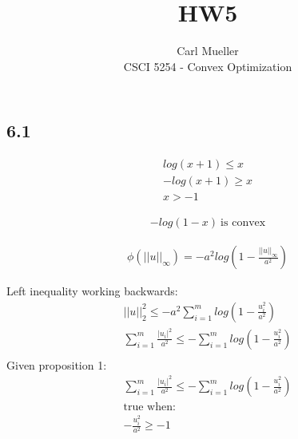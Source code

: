 \documentclass[12pt]{article}
\newenvironment{proposition}[2][Proposition]{\begin{trivlist}
\item[\hskip \labelsep {\bfseries #1}\hskip \labelsep {\bfseries #2.}]}{\end{trivlist}}
\begin{document}
 
 
 
\title{HW5}
\author{Carl Mueller\\ %
CSCI 5254 - Convex Optimization} %
\maketitle

\subsection*{6.1}
\begin{proposition}{1}
\begin{align}
log(x+1) \le x\\ -log(x+1) \ge x\\ x > -1
\end{align}
\end{proposition}

\begin{proposition}{2}
\begin{align}
-log(1-x)\ \text{is convex}
\end{align}
\end{proposition}
\begin{proposition}{3}
\begin{align}
\phi(||u||_{\infty}) = -a^2log(1-\frac{||u||_{\infty}}{a^2})
\end{align}
\end{proposition}

Left inequality working backwards:
\begin{equation*}
\begin{aligned}
||u||_{2}^{2} \le -a^2\sum_{i=1}^{m}log(1 - \frac{u_{i}^{2}}{a^2})\\
\sum_{i=1}^{m}\frac{|u_i|^2}{a^2} \le -\sum_{i=1}^{m}log(1 - \frac{u_{i}^{2}}{a^2})\\
\end{aligned}
\end{equation*}
Given proposition 1:
\begin{equation*}
\begin{aligned}
\sum_{i=1}^{m}\frac{|u_i|^2}{a^2} \le -\sum_{i=1}^{m}log(1 - \frac{u_{i}^{2}}{a^2})\\
\text{true when: }\\
- \frac{u_{i}^{2}}{a^2} \ge -1
\end{aligned}
\end{equation*}
\end{document}
